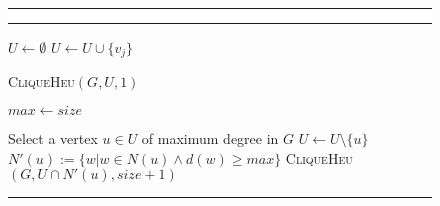 \begin{figure}
\vspace{10pt}
\hrule
\vspace{6pt}
\begin{spacing}{\algospacing}
{
{\small
{}\label{alg:mClqHeu}
\vspace{-5pt}
\hrule
\vspace{6pt}

\noindent\begin{minipage}{.5\textwidth}
\vspace{12pt}
\begin{algorithmic}[1]
{}
\State $U \leftarrow \emptyset$
\State $U \leftarrow U \cup \{v_j\}$ 
\EndIf
\EndFor

\State \textsc{CliqueHeu}$(G, U, 1)$
\EndIf

\EndFor
\EndProcedure
\end{algorithmic}
\end{minipage}%
\begin{minipage}{.5\textwidth}
\vspace{-7pt}
\label{alg:clqHeu}
\begin{algorithmic}[1]

\State $max \leftarrow size$
\EndIf
{}
\EndIf


\State Select a vertex $u \in U$ of maximum degree in $G$ \label{maxDsel}
\State $U \leftarrow U \setminus \{u\} $
\State $N'(u):= \{w | w \in N(u) \wedge d(w) \ge max\}$  \label{pr4}
\State \textsc{CliqueHeu}$( G, U \cap N'(u), size + 1)$


\EndProcedure

\end{algorithmic}
\end{minipage}
}
}
\end{spacing}
\vspace{8pt}
\hrule
\end{figure}









